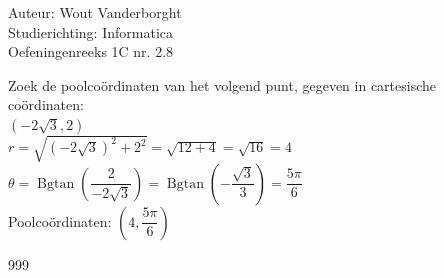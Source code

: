 \documentclass[a4paper]{article}
\newcommand{\Bgtan}{\operatorname{Bgtan}}
\begin{document}
  
\noindent \large Auteur: Wout Vanderborght\\
\noindent \large Studierichting: Informatica\\
\noindent \large Oefeningenreeks 1C nr. 2.8\\

\medskip

\normalsize

Zoek de poolcoördinaten van het volgend punt, gegeven in cartesische coördinaten: \\

$ \left(-2\sqrt{3}, 2\right)$ \\

$ r = \sqrt{\left(-2\sqrt{3}\right)^2 + 2^2} = \sqrt{12 + 4} = \sqrt{16} = 4$ \\

$ \theta = \Bgtan\left(\dfrac{2}{-2\sqrt{3}}\right) = \Bgtan\left(-\dfrac{\sqrt{3}}{3}\right) = \dfrac{5\pi}{6}$ \\

Poolcoördinaten: $ \left(4, \dfrac{5\pi}{6}\right) $ \\

\begin{thebibliography}{999}
\end{thebibliography}
\end{document}
